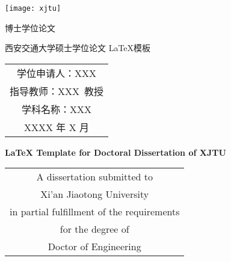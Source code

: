 
\begin{titlepage}
	\begin{center}
		\begin{figure*}[!ht]\vspace{5em}
			\centering
			\texttt{[image: xjtu]}
		\end{figure*}
		
		\vspace{1.5em}
		\begin{center} { 博士学位论文} \end{center}
		
		\vspace{8.5em}
		\begin{center} {\sanhao\hei 西安交通大学硕士学位论文 \LaTeX 模板}\end{center}
		
		\vspace{16em}
		{\sanhao
			\begin{center} \renewcommand{\arraystretch}{1.75}
				\begin{tabular}{c}
					学位申请人：XXX \\
					指导教师：XXX~教授 \\
					学科名称：XXX \\
					XXXX 年 X 月 \\
				\end{tabular} \renewcommand{\arraystretch}{1}
			\end{center} 
		}
	\end{center}
	\clearpage{\pagestyle{empty}\cleardoublepage}
	
	\newpage\thispagestyle{empty}
	\begin{center}
		\parbox[t][0.7cm][t]{\textwidth}{}
		
		\begin{center}{\sanhao\bfseries \LaTeX{} Template for Doctoral Dissertation of XJTU}\end{center}
		
		\vspace{4.7cm}
		{\sanhao
			\begin{center} \renewcommand{\arraystretch}{1.4}
				\begin{tabular}{c}
					A dissertation submitted to  \\
					Xi'an Jiaotong University \\
					in partial fulfillment of the requirements \\
					for the degree of \\
					Doctor of Engineering \\
				\end{tabular} \renewcommand{\arraystretch}{1}
			\end{center} 
		}
			

\end{center}
\end{titlepage}
